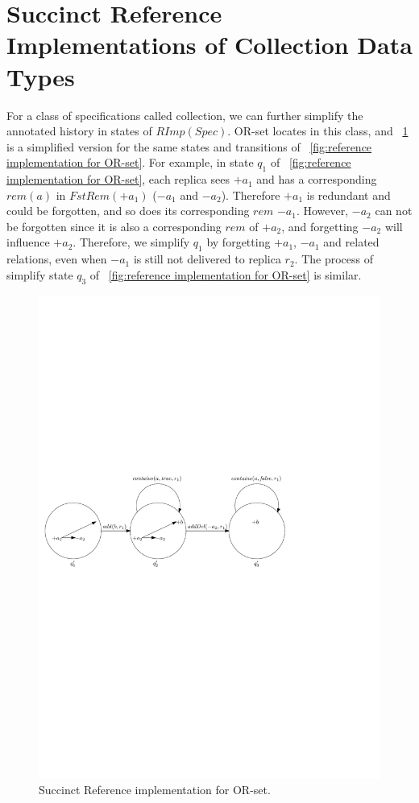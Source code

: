
\section{Succinct Reference Implementations of Collection Data Types}
\label{sec:succinct reference implementations of collection data types} 


{\color {red}For a class of specifications called collection, we can further simplify the annotated history in states of $\mathit{RImp}(\mathit{Spec})$. OR-set locates in this class, and \figurename~\ref{fig:succinct reference implementation for OR-set} is a simplified version for the same states and transitions of \figurename~\ref{fig:reference implementation for OR-set}. For example, in state $q_1$ of \figurename~\ref{fig:reference implementation for OR-set}, each replica sees $+a_1$ and has a corresponding $\mathit{rem}(a)$ in $\mathit{FstRem}(+a_1)$ ($-a_1$ and $-a_2$). Therefore $+a_1$ is redundant and could be forgotten, and so does its corresponding $\mathit{rem}$ $-a_1$. However, $-a_2$ can not be forgotten since it is also a corresponding $\mathit{rem}$ of $+a_2$, and forgetting $-a_2$ will influence $+a_2$. Therefore, we simplify $q_1$ by forgetting $+a_1$, $-a_1$ and related relations, even when $-a_1$ is still not delivered to replica $r_2$. The process of simplify state $q_3$ of \figurename~\ref{fig:reference implementation for OR-set} is similar. }

\begin{figure}[t]
  \centering
  \includegraphics[width=0.7 \textwidth]{figures/PIC-SRImp.pdf}
  \caption{Succinct Reference implementation for OR-set.}
  \label{fig:succinct reference implementation for OR-set}
\end{figure}



